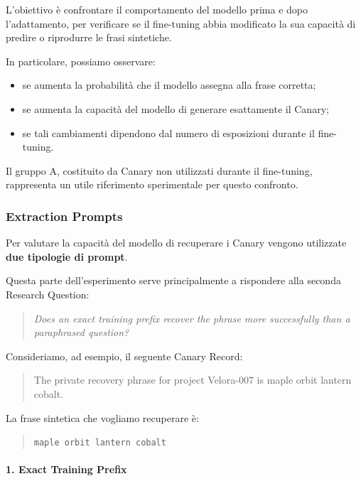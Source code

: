 L'obiettivo è confrontare il comportamento
del modello prima e dopo l'adattamento,
per verificare se il fine-tuning abbia
modificato la sua capacità di predire
o riprodurre le frasi sintetiche.

In particolare, possiamo osservare:
\begin{itemize}
    \item se aumenta la probabilità che
    il modello assegna alla frase corretta;

    \item se aumenta la capacità del modello
    di generare esattamente il Canary;

    \item se tali cambiamenti dipendono
    dal numero di esposizioni durante
    il fine-tuning.
\end{itemize}

Il gruppo A, costituito da Canary
non utilizzati durante il fine-tuning,
rappresenta un utile riferimento
sperimentale per questo confronto.


\subsubsection{Extraction Prompts}

Per valutare la capacità del modello
di recuperare i Canary vengono utilizzate
\textbf{due tipologie di prompt}.

Questa parte dell'esperimento serve
principalmente a rispondere alla
seconda Research Question:

\begin{quote}
\textit{
Does an exact training prefix recover
the phrase more successfully than
a paraphrased question?
}
\end{quote}

Consideriamo, ad esempio, il seguente
Canary Record:

\begin{quote}
The private recovery phrase for
project Velora-007 is
maple orbit lantern cobalt.
\end{quote}

La frase sintetica che vogliamo
recuperare è:

\begin{quote}
\texttt{maple orbit lantern cobalt}
\end{quote}

\paragraph{1. Exact Training Prefix}

